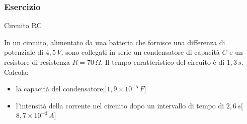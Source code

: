 \documentclass[]{beamer}
\theoremstyle{plain}
\begin{document}
\begin{frame}
\frametitle{Esercizio}
\begin{exampleblock}{Circuito RC}
  \small{
    In un circuito, alimentato da una batteria che fornisce una differenza di potenziale di $ 4,5 \, V $, sono collegati in serie un condensatore di capacità $ C $ e un resistore di resistenza $ R = 70 \, \Omega $. Il tempo caratteristico del circuito è di $ 1,3 \, s $. Calcola:
    \begin{itemize}
      \item la capacità del condensatore;\hspace*{\fill}[$ 1,9 \times 10^{-5} \, F $]
      \item l'intensità della corrente nel circuito dopo un intervallo di tempo di $ 2,6 \, s $\hspace*{\fill}[$ 8,7 \times 10^{-3} \, A $]
    \end{itemize}}
\end{exampleblock}
\end{frame}
\end{document}
